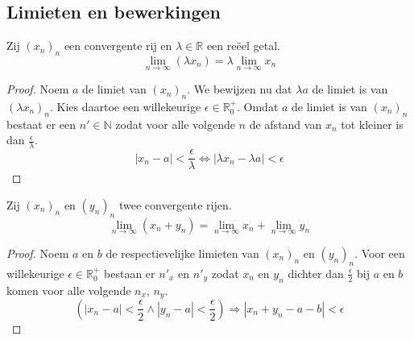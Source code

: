\documentclass[main.tex]{subfiles}
\begin{document}
\subsection{Limieten en bewerkingen}
\label{sec:limi-en-bewerk}

\begin{bst}
  Zij $(x_{n})_{n}$ een convergente rij en $\lambda\in \mathbb{R}$ een re\"eel getal.
  \[ \lim_{n \rightarrow \infty}(\lambda x_{n}) = \lambda \lim_{n\rightarrow \infty}x_{n} \]

  \begin{proof}
    Noem $a$ de limiet van $(x_{n})_{n}$.
    We bewijzen nu dat $\lambda a$ de limiet is van $(\lambda x_{n})_{n}$.
    Kies daartoe een willekeurige $\epsilon \in \mathbb{R}_{0}^{+}$.
    Omdat $a$ de limiet is van $(x_{n})_{n}$ bestaat er een $n'\in \mathbb{N}$ zodat voor alle volgende $n$ de afstand van $x_{n}$ tot kleiner is dan $\frac{\epsilon}{\lambda}.$
    \[ |x_{n}-a| < \frac{\epsilon}{\lambda} \Leftrightarrow |\lambda x_{n}-\lambda a| < \epsilon \]
  \end{proof}
\end{bst}

\begin{bst}
  \label{st:som-van-limieten-is-limiet-van-som}
  Zij $(x_{n})_{n}$ en $(y_{n})_{n}$ twee convergente rijen.
  \[ \lim_{n \rightarrow \infty}(x_{n}+y_{n}) = \lim_{n\rightarrow \infty}x_{n} + \lim_{n\rightarrow \infty}y_{n} \]

  \begin{proof}
    Noem $a$ en $b$ de respectievelijke limieten van $(x_{n})_{n}$ en $(y_{n})_{n}$.
    Voor een willekeurige $\epsilon \in \mathbb{R}_{0}^{+}$ bestaan er $n'_{x}$ en $n'_{y}$ zodat $x_{n}$ en $y_{n}$ dichter dan $\frac{\epsilon}{2}$ bij $a$ en $b$ komen voor alle volgende $n_{x}$, $n_{y}$.
    \[ \left( |x_{n}-a| < \frac{\epsilon}{2} \wedge |y_{n}-a| < \frac{\epsilon}{2} \right) \Rightarrow |x_{n}+y_{n} - a-b| < \epsilon \]
  \end{proof}
\end{bst}
\end{document}

